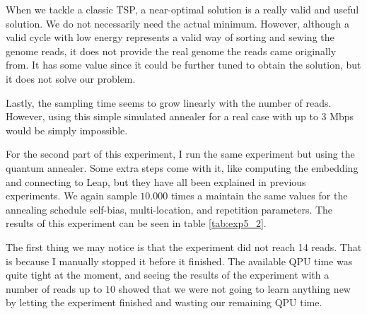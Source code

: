 When we tackle a classic TSP, a near-optimal solution is a really valid and useful solution. We do not necessarily need the actual minimum. However, although a valid cycle with low energy represents a valid way of sorting and sewing the genome reads, it does not provide the real genome the reads came originally from. It has some value since it could be further tuned to obtain the solution, but it does not solve our problem.

Lastly, the sampling time seems to grow linearly with the number of reads. However, using this simple simulated annealer for a real case with up to 3 Mbps would be simply impossible.

For the second part of this experiment, I run the same experiment but using the quantum annealer. Some extra steps come with it, like computing the embedding and connecting to Leap, but they have all been explained in previous experiments. We again sample $10.000$ times a maintain the same values for the annealing schedule self-bias, multi-location, and repetition parameters. The results of this experiment can be seen in table \ref{tab:exp5_2}.

\begin{table}[H]
	\centering
	\caption{Results of experiment 5, $10.000$ reads using the quantum annealer.}
	\label{tab:exp5_2}
\end{table}

The first thing we may notice is that the experiment did not reach 14 reads. That is because I manually stopped it before it finished. The available QPU time was quite tight at the moment, and seeing the results of the experiment with a number of reads up to $10$ showed that we were not going to learn anything new by letting the experiment finished and wasting our remaining QPU time.

